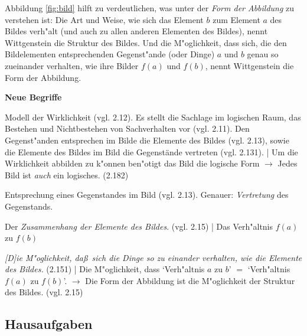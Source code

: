 \documentclass[]{scrartcl}
\begin{document}
Abbildung \ref{fig:bild} hilft zu verdeutlichen, was unter der \emph{Form der Abbildung} zu verstehen ist: Die Art und Weise, wie sich das Element $b$ zum Element $a$ des Bildes verh"alt (und auch zu allen anderen Elementen des Bildes), nennt Wittgenstein die Struktur des Bildes. Und die M"oglichkeit, dass sich, die den Bildelementen entsprechenden Gegenst"ande (oder Dinge) $a$ und $b$ genau so zueinander verhalten, wie ihre Bilder $f(a)$ und $f(b)$, nennt Wittgenstein die Form der Abbildung.


\vspace{10pt}
\textbf{Neue Begriffe}

\begin{description}[leftmargin=!,labelwidth=\widthof{\bfseries Form der Abbildun}]
  \item[Bild] Modell der Wirklichkeit (vgl. 2.12). Es stellt die Sachlage im logischen Raum, das Bestehen und Nichtbestehen von Sachverhalten vor (vgl. 2.11). Den Gegenst"anden entsprechen im Bilde die Elemente des Bildes (vgl. 2.13), sowie die Elemente des Bildes im Bild die Gegenstände vertreten (vgl. 2.131). | Um die Wirklichkeit abbilden zu k"onnen ben"otigt das Bild die logische Form $\rightarrow$ Jedes Bild ist \emph{auch} ein logisches. (2.182)
  \item[Element des Bildes] Entsprechung eines Gegenstandes im Bild (vgl. 2.13). Genauer: \emph{Vertretung} des Gegenstands.
  \item[Struktur des Bildes] Der \emph{Zusammenhang der Elemente des Bildes}. (vgl. 2.15) | Das Verh"altnis $f(a)$ zu $f(b)$
  \item[Form der Abbildung] \emph{[D]ie M"oglichkeit, da\ss~sich die Dinge so zu einander verhalten, wie die Elemente des Bildes.} (2.151) | Die M"oglichkeit, dass `Verh"altnis $a$ zu $b$' $=$ `Verh"altnis $f(a)$ zu $f(b)$'. $\rightarrow$ Die Form der Abbildung ist die M"oglichkeit der Struktur des Bildes. (vgl. 2.15)
\end{description}


\subsection{Hausaufgaben}
\end{document}
